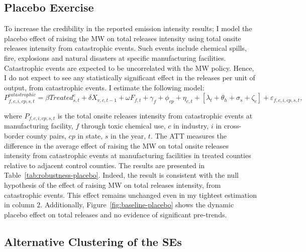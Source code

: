 \documentclass[12pt, english]{article}
\begin{document}
    \subsection{Placebo Exercise}\label{subsec:placebo-exercise}
    To increase the credibility in the reported emission intensity results; I model the placebo effect of raising the MW on total releases intensity using total onsite releases intensity from catastrophic events. Such events include chemical spills, fire, explosions and natural disasters at specific manufacturing facilities. Catastrophic events are expected to be uncorrelated with the MW policy. Hence, I do not expect to see any statistically significant effect in the releases per unit of output, from catastrophic events. I estimate the following model:
    \begin{equation}
        P_{f,c,i,cp,s,t}^{catastrophic} = \beta Treated_{s,t}^e + \delta X_{v,c,t-1} + \omega F_{f,t} + \gamma_{f} + \phi_{cp} + \eta_{c,t} + \left[\lambda_{t} + \theta_{h} + \sigma_{s} + \zeta_{c} \right] + \varepsilon_{f,c,i,cp,s,t},\label{eq:robustness-placebo}
    \end{equation}
    

    where $P_{f,c,i,cp,s,t}$ is the total onsite releases intensity from catastrophic events at manufacturing facility, $f$ through toxic chemical use, $c$ in industry, $i$ in cross-border county pairs, $cp$ in state, $s$ in the year, $t$. The ATT measures the difference in the average effect of raising the MW on total onsite releases intensity from catastrophic events at manufacturing facilities in treated counties relative to adjacent control counties. The results are presented in Table~\ref{tab:robustness-placebo}. Indeed, the result is consistent with the null hypothesis of the effect of raising MW on total releases intensity, from catastrophic events. This effect remains unchanged even in my tightest estimation in column $2$. Additionally, Figure~\ref{fig:baseline-placebo} shows the dynamic placebo effect on total releases and no evidence of significant pre-trends.
    

    \subsection{Alternative Clustering of the SEs}\label{subsec:alternative-clustering-of-the-ses}
    
    
    
    
\end{document}
